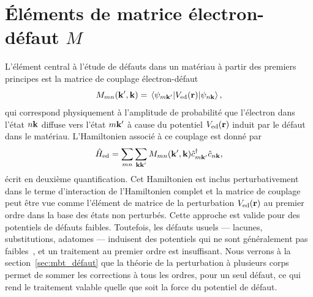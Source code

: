 \section{Éléments de matrice électron-défaut $M$}\label{sec:M_défaut}

L'élément central à l'étude de défauts dans un matériau à partir des premiers principes est la matrice de couplage électron-défaut
\begin{equation}
    M_{mn}(\kv',\kv) = \matrixel{\psi_{m\kv'}}{V_\text{ed}(\rv)}{\psi_{n\kv}},\label{eqn:M}
\end{equation}
qui correspond physiquement à l'amplitude de probabilité que l'électron dans l'état $n\mathbf{k}$ diffuse vers l'état $m\mathbf{k}'$ à cause du potentiel $V_\text{ed}(\mathbf{r})$ induit par le défaut dans le matériau. L'Hamiltonien associé à ce couplage est donné par
\begin{equation}
    \hat{H}_\text{ed} = \sum_{mn}\sum_{\mathbf{k}\mathbf{k}'}M_{mn}(\mathbf{k}',\mathbf{k})\hat{c}^\dag_{m\mathbf{k}'}\hat{c}_{n\mathbf{k}},
\end{equation}
écrit en deuxième quantification. Cet Hamiltonien est inclus perturbativement dans le terme d'interaction de l'Hamiltonien complet et la matrice de couplage peut être vue comme l'élément de matrice de la perturbation $V_\text{ed}(\mathbf{r})$ au premier ordre dans la base des états non perturbés. Cette approche est valide pour des potentiels de défauts faibles. Toutefois, les défauts usuels --- lacunes, substitutions, adatomes --- induisent des potentiels qui ne sont généralement pas faibles~\cite{banhartStructuralDefectsGraphene2011}, et un traitement au premier ordre est insuffisant. Nous verrons à la section~\ref{sec:mbt_défaut} que la théorie de la perturbation à plusieurs corps permet de sommer les corrections à tous les ordres, pour un seul défaut, ce qui rend le traitement valable quelle que soit la force du potentiel de défaut.


